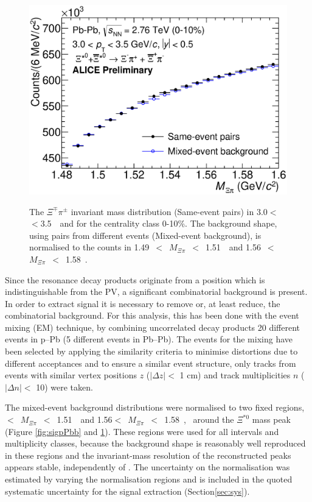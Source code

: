 \begin{figure}[htbp]
\begin{center}
\includegraphics[width=12.0cm]{./Version1/FigChapter5/Extraction/SigPbPb_Before.eps}
\hspace{0.5cm}
\label{fig:sigPbPbb} 
\caption{ The $\Xi^{\mp}\pi^{\pm}$ invariant mass distribution (Same-event pairs) in 
3.0$<$ \pt $<$3.5~\gmom~and for the centrality class 0-10\%. The background shape, 
using pairs from different events (Mixed-event background), is normalised to the counts in 
1.49~$<$~$M_{\Xi\pi}$~$<$~1.51~\Gmass~and 1.56~$<$~$M_{\Xi\pi}$~$<$~1.58~\Gmass. }
\end{center}
\end{figure}

Since the resonance decay products originate from a position which is indistinguishable from the PV,
a significant combinatorial background is present. In order to extract \xis signal it is necessary to remove or, at least reduce, the combinatorial background. For this analysis, this has been done with the event mixing (EM) technique, by combining uncorrelated decay products  20 different events in p--Pb (5 different events in Pb--Pb). The events for the mixing have been selected by applying the similarity criteria to minimise distortions due to different acceptances and to ensure a similar event structure, only tracks from events with similar vertex positions $z$ ($|\Delta z| <$ 1 cm) and track multiplicities $n$ ($|\Delta n|<$ 10) were taken.

The mixed-event background distributions were normalised to two fixed regions, 
~$<$~$M_{\Xi\pi}$~$<$~1.51~\Gmass~and 1.56$<$~$M_{\Xi\pi}$~$<$~1.58~\Gmass,
~around the $\Xi^{*0}$ mass peak (Figure \ref{fig:sigpPbb} and \ref{fig:sigPbPbb}). These regions were used for all \pt intervals and multiplicity classes, because the background shape is reasonably well reproduced in these regions and the invariant-mass resolution of the reconstructed peaks appears stable, independently of \pt. The uncertainty on the normalisation was estimated by varying the normalisation regions and is included in the quoted systematic uncertainty for the signal extraction (Section\ref{sec:sys}).

